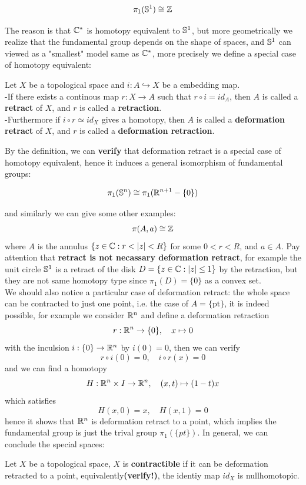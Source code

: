 \begin{claim}
    \[\pi_1(\mathbb{S}^1) \cong \mathbb{Z}\]
\end{claim}
The reason is that \(\mathbb{C}^*\) is homotopy equivalent to \(\mathbb{S}^1\), but more geometrically we realize that the fundamental group depends on the shape of spaces, and \(\mathbb{S}^{1}\) can viewed as a "smallest" model same as \(\mathbb{C}^*\), more precisely we define a special case of homotopy equivalent:
\begin{definition}
    Let \(X\) be a topological space and \(i:A \hookrightarrow X\) be a embedding map.\\
    
    -If there exists a continous map \(r:X \to A\) such that \(r \circ i = id_A\), then \(A\) is called a \textbf{retract} of \(X\), and \(r\) is called a \textbf{retraction}.\\

    -Furthermore if \(i \circ r \simeq id_X\) gives a homotopy, then \(A\) is called a \textbf{deformation retract} of \(X\), and \(r\) is called a \textbf{deformation retraction}.
\end{definition}
 By the definition, we can \textbf{verify} that deformation retract is a special case of homotopy equivalent, hence it induces a general isomorphism of fundamental groups:
 \begin{claim}
    \[\pi_1(\mathbb{S}^n) \cong \pi_1(\mathbb{R}^{n+1}-\{0\}) \]
 \end{claim}
 and similarly we can give some other examples:
 \[\pi(A,a) \cong \mathbb{Z}\]
 where \(A\) is the annulus \(\{z \in \cc: r<|z|<R\}\) for some \(0<r<R\), and \(a \in A\). Pay attention that \textbf{retract is not necassary deformation retract}, for example the unit circle \(\mathbb{S}^1\) is a retract of the disk \(D = \{z \in \mathbb{C}: |z| \leq 1\}\) by the retraction, but they are not same homotopy type since \(\pi_1(D) = \{0\}\) as a convex set.\\

 We should also notice a particular case of deformation retract: the whole space can be contracted to just one point, i.e. the case of \(A = \{\text{pt}\}\), it is indeed possible, for example we consider \(\mathbb{R}^n\) and define a deformation retraction
 \[r:\mathbb{R}^n \to \{0\}, \quad x \mapsto 0\]
 with the inculsion \(i:\{0\} \to \mathbb{R}^n\) by \(i(0) = 0\), then we can verify
 \[r \circ i(0) = 0, \quad i \circ r(x) = 0\]
 and we can find a homotopy 
\[H:\mathbb{R}^n \times I \to \mathbb{R}^n, \quad (x,t) \mapsto (1-t)x\]
which satisfies
\[H(x,0) = x, \quad H(x,1) = 0\]
hence it shows that \(\mathbb{R}^n\) is deformation retract to a point, which implies the fundamental group is just the trival group \(\pi_1(\{pt\})\). In general, we can conclude the special spaces:
\begin{definition}
    Let \(X\) be a topological space, \(X\) is \textbf{contractible} if it can be deformation retracted to a point, equivalently\textbf{(verify!)}, the identiy map \(id_X\) is nullhomotopic.
\end{definition}

